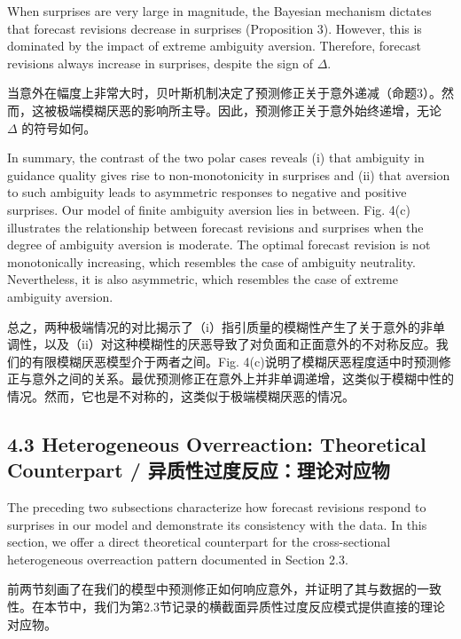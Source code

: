 \documentclass[12pt,a4paper]{article}
\newenvironment{original}
  {\par\medskip\noindent\ignorespaces}
  {\par\medskip}
\newenvironment{translation}
  {\par\noindent{\color{transblue}\ignorespaces}}
  {\par\bigskip}
\begin{document}
\begin{original}
When surprises are very large in magnitude, the Bayesian mechanism dictates that forecast revisions decrease in surprises (Proposition 3). However, this is dominated by the impact of extreme ambiguity aversion. Therefore, forecast revisions always increase in surprises, despite the sign of $\Delta$.
\end{original}
\begin{translation}
当意外在幅度上非常大时，贝叶斯机制决定了预测修正关于意外递减（命题3）。然而，这被极端模糊厌恶的影响所主导。因此，预测修正关于意外始终递增，无论 $\Delta$ 的符号如何。
\end{translation}

\begin{original}
In summary, the contrast of the two polar cases reveals (i) that ambiguity in guidance quality gives rise to non-monotonicity in surprises and (ii) that aversion to such ambiguity leads to asymmetric responses to negative and positive surprises. Our model of finite ambiguity aversion lies in between. Fig. 4(c) illustrates the relationship between forecast revisions and surprises when the degree of ambiguity aversion is moderate. The optimal forecast revision is not monotonically increasing, which resembles the case of ambiguity neutrality. Nevertheless, it is also asymmetric, which resembles the case of extreme ambiguity aversion.
\end{original}
\begin{translation}
总之，两种极端情况的对比揭示了（i）指引质量的模糊性产生了关于意外的非单调性，以及（ii）对这种模糊性的厌恶导致了对负面和正面意外的不对称反应。我们的有限模糊厌恶模型介于两者之间。Fig. 4(c)说明了模糊厌恶程度适中时预测修正与意外之间的关系。最优预测修正在意外上并非单调递增，这类似于模糊中性的情况。然而，它也是不对称的，这类似于极端模糊厌恶的情况。
\end{translation}

\subsection{4.3 Heterogeneous Overreaction: Theoretical Counterpart / 异质性过度反应：理论对应物}

\begin{original}
The preceding two subsections characterize how forecast revisions respond to surprises in our model and demonstrate its consistency with the data. In this section, we offer a direct theoretical counterpart for the cross-sectional heterogeneous overreaction pattern documented in Section 2.3.
\end{original}
\begin{translation}
前两节刻画了在我们的模型中预测修正如何响应意外，并证明了其与数据的一致性。在本节中，我们为第2.3节记录的横截面异质性过度反应模式提供直接的理论对应物。
\end{translation}
\end{document}

